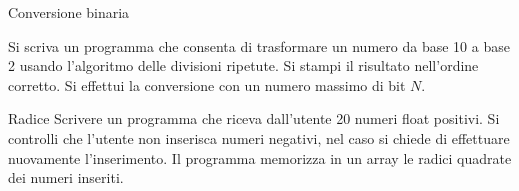 \documentclass[aspectratio=169,]{beamer}
\begin{document}
\begin{frame}{Conversione binaria}

Si scriva un programma che consenta di trasformare un numero da base 10 a base 2 usando l'algoritmo delle divisioni ripetute. Si stampi il risultato nell'ordine corretto. Si effettui la conversione con un numero massimo di bit $N$.
\end{frame}

\begin{frame}{Radice}
Scrivere un programma che riceva dall'utente 20 numeri float positivi.
Si controlli che l'utente non inserisca numeri negativi, nel caso si chiede di effettuare nuovamente l'inserimento.
Il programma memorizza in un array le radici quadrate dei numeri inseriti.
\end{frame}

%
\end{document}
